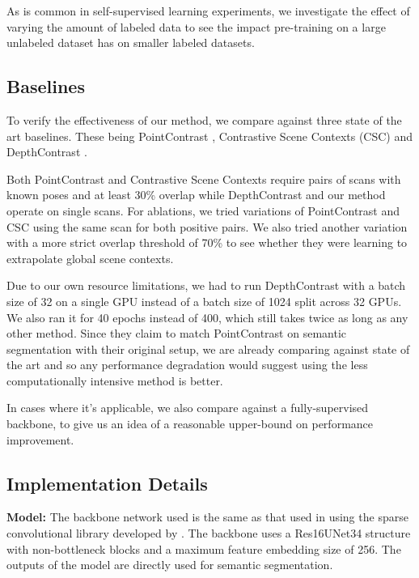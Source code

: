 \documentclass[10pt,twocolumn,letterpaper]{article}
\begin{document}
As is common in self-supervised learning experiments, we investigate the effect of varying the amount of labeled data to see the impact pre-training on a large unlabeled dataset has on smaller labeled datasets.

\subsection{Baselines}
\label{sec:results:baselines}

To verify the effectiveness of our method, we compare against three state of the art baselines. These being PointContrast \cite{xie2020pointcontrast}, Contrastive Scene Contexts (CSC) \cite{hou2021Exploring} and DepthContrast \cite{zhang2021Self}.

Both PointContrast and Contrastive Scene Contexts require pairs of scans with known poses and at least 30\% overlap while DepthContrast and our method operate on single scans. For ablations, we tried variations of PointContrast and CSC using the same scan for both positive pairs. We also tried another variation with a more strict overlap threshold of 70\% to see whether they were learning to extrapolate global scene contexts.

Due to our own resource limitations, we had to run DepthContrast with a batch size of 32 on a single GPU instead of a batch size of 1024 split across 32 GPUs. We also ran it for 40 epochs instead of 400, which still takes twice as long as any other method. Since they claim to match PointContrast on semantic segmentation with their original setup, we are already comparing against state of the art and so any performance degradation would suggest using the less computationally intensive method is better.

In cases where it's applicable, we also compare against a fully-supervised backbone, to give us an idea of a reasonable upper-bound on performance improvement.

\subsection{Implementation Details}
\label{sec:results:implementation}

\textbf{Model:} The backbone network used is the same as that used in \cite{xie2020pointcontrast, hou2021Exploring} using the sparse convolutional library developed by \cite{choy20194d}. The backbone uses a Res16UNet34 structure with non-bottleneck blocks and a maximum feature embedding size of 256. The outputs of the model are directly used for semantic segmentation.
\end{document}
